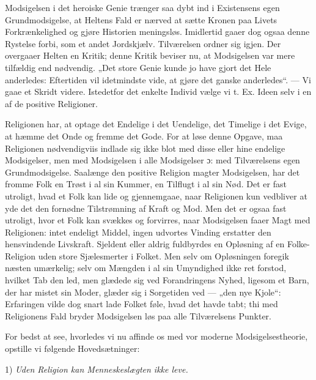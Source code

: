 \documentclass[12pt,a4paper]{book}
\begin{document}
Modsigelsen i det heroiske Genie trænger saa dybt ind i
Existensens egen Grundmodsigelse, at Heltens Fald er nærved at sætte Kronen paa
Livets Forkrænkelighed og gjøre Historien meningsløs. Imidlertid gaaer dog ogsaa
denne Rystelse forbi, som et andet Jordskjælv. Tilværelsen ordner sig igjen. Der
overgaaer Helten en Kritik; denne Kritik beviser nu, at Modsigelsen var mere
tilfældig end nødvendig. „Det store Genie kunde jo have gjort det Hele
anderledes: Eftertiden vil idetmindste vide, at gjøre det ganske anderledes“. ---
Vi gaae et Skridt videre. Istedetfor det enkelte Individ vælge vi
t. Ex. Ideen selv i en af de positive Religioner.

Religionen har, at optage det Endelige i det Uendelige, det Timelige i det Evige,
at hæmme det Onde og fremme det Gode. For at løse denne Opgave, maa Religionen
nødvendigviis indlade sig ikke blot med disse eller hine endelige Modsigelser,
men med Modsigelsen i alle Modsigelser ɔ: med Tilværelsens egen Grundmodsigelse.
Saalænge den positive Religion magter Modsigelsen, har det fromme Folk en Trøst i
al sin Kummer, en Tilflugt i al sin Nød. Det er fast utroligt, hvad et Folk kan
lide og gjennemgaae, naar Religionen kun vedbliver at yde det den fornødne
Tilstrømning af Kraft og Mod. Men det er ogsaa fast utroligt, hvor et Folk kan
svækkes og forvirres, naar Modsigelsen faaer Magt med Religionen: intet endeligt
Middel, ingen udvortes Vinding erstatter den hensvindende Livskraft. Sjeldent
eller aldrig fuldbyrdes en Opløsning af en Folke-Religion uden store
Sjælesmerter i Folket. Men selv om Opløsningen foregik næsten umærkelig; selv om
Mængden i al sin Umyndighed ikke ret forstod, hvilket Tab den led, men glædede
sig ved Forandringens Nyhed, ligesom et Barn, der har mistet sin Moder, glæder
sig i Sorgetiden ved --- „den nye Kjole“: Erfaringen vilde dog snart lade Folket
føle, hvad det havde tabt; thi med Religionens Fald bryder Modsigelsen løs paa
alle Tilværelsens Punkter.

For bedst at see, hvorledes vi nu affinde os med vor moderne
Modsigelsestheorie, opstille vi følgende Hovedsætninger:

1) \emph{Uden Religion kan Menneskeslægten ikke leve.}
\end{document}
